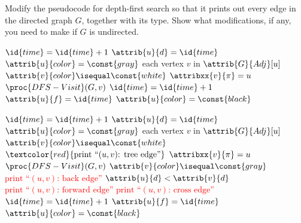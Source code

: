 \item[\textbf{Exercise 20.3-9}]
Modify the pseudocode for depth-first search so that it prints out every edge in
the directed graph $G$, together with its type. Show what modifications, if any,
you need to make if $G$ is undirected.

\begin{minipage}{\linewidth}
    \centering
    \begin{codebox}
    \li $\id{time} = \id{time} + 1$                  
    \zi                                              {}
    \li $\attrib{u}{d} = \id{time}$
    \li $\attrib{u}{color} = \const{gray}$
    \li \For each vertex $v$ in $\attrib{G}{Adj}[u]$  \Do
    \li     \If $\attrib{v}{color} \isequal \const{white}$ \Then
    \li         $\attribxx{v}{\pi} = u$
    \li         $\proc{DFS-Visit}(G, v)$
            \End
        \End
    \li $\id{time} = \id{time} + 1$
    \li $\attrib{u}{f} = \id{time}$
    \li $\attrib{u}{color} = \const{black}$          
    \end{codebox}
    \label{figure:dfs-visit}
\end{minipage}

\Solution

\begin{minipage}{\linewidth}
    \centering
    \begin{codebox}
        \li $\id{time} = \id{time} + 1$                  
        \zi                                              {}
        \li $\attrib{u}{d} = \id{time}$
        \li $\attrib{u}{color} = \const{gray}$
        \li \For each vertex $v$ in $\attrib{G}{Adj}[u]$  \Do
        \li     \If $\attrib{v}{color} \isequal \const{white}$ \Then
        \li         $\textcolor{red}{\text{print ``}(u, v)\text{: tree edge''}}$
        \li         $\attribxx{v}{\pi} = u$
        \li         $\proc{DFS-Visit}(G, v)$
        \li \ElseIf \textcolor{red}{$\attrib{v}{color} \isequal \const{gray}$} \Then
        \li         \textcolor{red}{$\text{print ``}(u, v)\text{: back edge''}$}
        \li     \ElseIf \textcolor{red}{$\attrib{u}{d} < \attrib{v}{d}$} \Then
        \li         \textcolor{red}{$\text{print ``}(u, v)\text{: forward edge''}$}
        \li     \Else
        \li         \textcolor{red}{$\text{print ``}(u, v)\text{: cross edge''}$}
                \End
            \End
        \li $\id{time} = \id{time} + 1$
        \li $\attrib{u}{f} = \id{time}$
        \li $\attrib{u}{color} = \const{black}$          
    \end{codebox}
    \label{figure:modified-dfs-visit}
\end{minipage}
